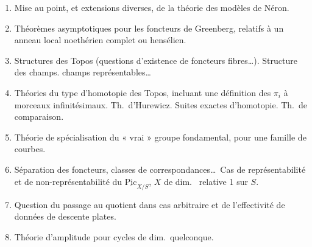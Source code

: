 \documentclass[11pt,a4paper]{article}
\begin{document}
\begin{enumerate}
\item[12)] Mise au point, et extensions diverses, de la théorie des modèles de
Néron.


\item[(13)] Théorèmes asymptotiques pour les foncteurs de Greenberg, relatifs à
un anneau local noethérien complet ou hensélien.


\item[14)] Structures des Topos (questions d'existence de foncteurs
fibres…). Structure des champs. champs représentables…

\item[(15)] Théories du type d'homotopie des Topos, incluant une
définition des $\pi_{i}$ à  morceaux infinitésimaux.
Th.\ d'Hurewicz. Suites exactes d'homotopie. Th.\ de comparaison.
\struck{\ill}


\item[(16)] Théorie de spécialisation du « vrai » groupe fondamental, pour
une famille de courbes.


\item[17)] Séparation des foncteurs, classes de correspondances…\
Cas de représentabilité et de non-représentabilité du
$\underline{\mathrm{Pic}}_{X/S}$, $X$ de dim.\ \struck{\ill} relative 1 sur $S$.


\item[(18)] Question du passage au quotient dans cas arbitraire et de
l'effectivité de données de descente plates.

\item[(19)] Théorie d'amplitude pour cycles de dim.\ quelconque.
\end{enumerate}

\end{document}
